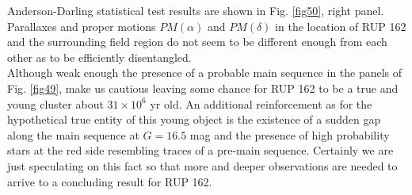 \documentclass[draft]{aa}
\begin{document}
Anderson-Darling statistical test results are shown in Fig. \ref{fig50}, right
panel. Parallaxes and proper motions $PM(\alpha)$ and $PM(\delta)$ in the
location of RUP 162 and the surrounding field region do not seem to be
different enough from each other as to be efficiently disentangled.\\

Although weak enough the presence of a probable main sequence in the 
panels of Fig. \ref{fig49}, make us cautious leaving some chance for RUP 162 to
be a true and young cluster about $31\times10^6$ yr old. An additional
reinforcement as for the hypothetical true entity of this young object is the
existence of a sudden gap along the main sequence at $G=16.5$ mag and the
presence of high probability stars at the red side resembling traces of a
pre-main sequence. Certainly we are just speculating on this fact so that more
and deeper observations are needed to arrive to a concluding result for RUP
162.
\end{document}
